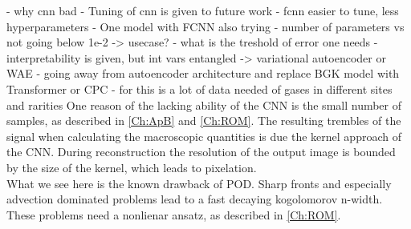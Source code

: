- why cnn bad
- Tuning of cnn is given to future work
- fcnn easier to tune, less hyperparameters
- One model with FCNN also trying 
- number of parameters vs not going below 1e-2 -> usecase?
- what is the treshold of error one needs
- interpretability is given, but int vars entangled -> variational autoencoder or WAE
- going away from autoencoder architecture and replace BGK model with Transformer or CPC
- for this is a lot of data needed of gases in different sites and rarities
One reason of the lacking ability of the CNN is the small number of samples, as described in \cref{Ch:ApB} and \cref{Ch:ROM}. The resulting trembles of the signal when calculating the macroscopic quantities is due the kernel approach of the CNN. During reconstruction the resolution of the output image is bounded by the size of the kernel, which leads to pixelation.\\
What we see here is the known drawback of POD. Sharp fronts and especially advection dominated problems lead to a fast decaying kogolomorov n-width. These problems need a nonlienar ansatz, as described in \cref{Ch:ROM}.